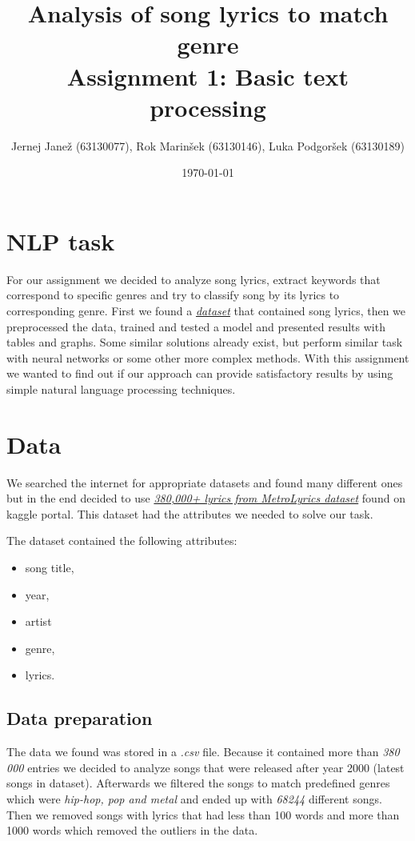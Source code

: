 \documentclass[a4paper,11pt]{article}
\title{%
Analysis of song lyrics to match genre \\
\large Assignment 1: Basic text processing}
\author{Jernej Janež (63130077), Rok Marinšek (63130146), Luka Podgoršek (63130189)}
\date{\today}
\begin{document}
\maketitle

\section{NLP task}
For our assignment we decided to analyze song lyrics, extract keywords that correspond to specific genres and try to classify song by its lyrics to corresponding genre. First we found a \href{https://www.kaggle.com/gyani95/380000-lyrics-from-metrolyrics}{\textit{dataset}} that contained song lyrics, then we preprocessed the data, trained and tested a model and presented results with tables and graphs. Some similar solutions already exist, but perform similar task with neural networks or some other more complex methods. With this assignment we wanted to find out if our approach can provide satisfactory results by using simple natural language processing techniques.

\section{Data}
We searched the internet for appropriate datasets and found many different ones but in the end decided to use \href{https://www.kaggle.com/gyani95/380000-lyrics-from-metrolyrics}{\textit{380,000+ lyrics from MetroLyrics dataset}} found on kaggle portal. This dataset had the attributes we needed to solve our task.

\noindent The dataset contained the following attributes:
\begin{itemize}
\item song title,
\item year,
\item artist
\item genre,
\item lyrics.
\end{itemize}

\subsection{Data preparation}
The data we found was stored in a \textit{.csv} file. Because it contained more than \textit{380 000} entries we decided to analyze songs that were released after year 2000 (latest songs in dataset). Afterwards we filtered the songs to match predefined genres which were \textit{hip-hop, pop and metal} and ended up with \textit{68244} different songs. Then we removed songs with lyrics that had less than 100 words and more than 1000 words which removed the outliers in the data.
\end{document}
